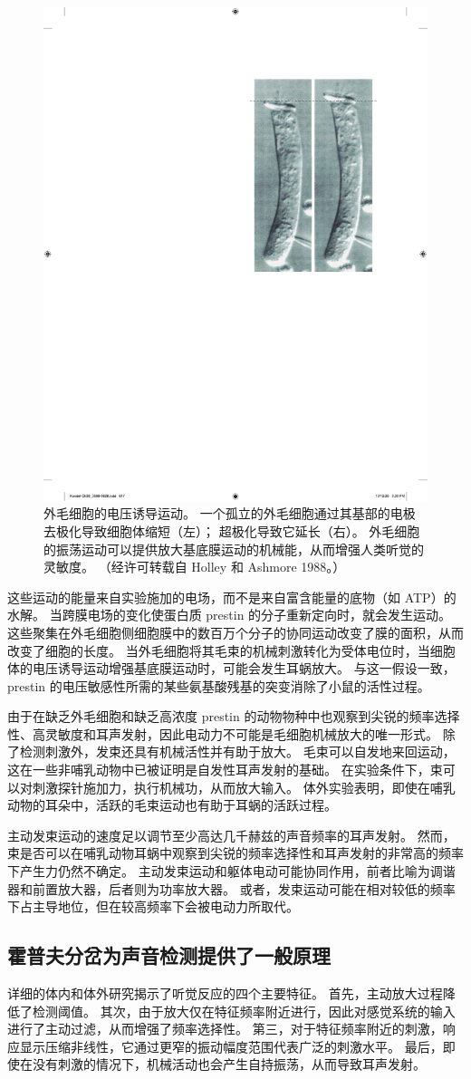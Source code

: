 \begin{figure}[htbp]
	\centering
	\includegraphics[width=0.5\linewidth]{chap26/fig_26_14}
	\caption{外毛细胞的电压诱导运动。 一个孤立的外毛细胞通过其基部的电极去极化导致细胞体缩短（左）； 超极化导致它延长（右）。 外毛细胞的振荡运动可以提供放大基底膜运动的机械能，从而增强人类听觉的灵敏度。 （经许可转载自 Holley 和 Ashmore 1988。）}
	\label{fig:26_14}
\end{figure}


这些运动的能量来自实验施加的电场，而不是来自富含能量的底物（如 ATP）的水解。 当跨膜电场的变化使蛋白质 prestin 的分子重新定向时，就会发生运动。 这些聚集在外毛细胞侧细胞膜中的数百万个分子的协同运动改变了膜的面积，从而改变了细胞的长度。 当外毛细胞将其毛束的机械刺激转化为受体电位时，当细胞体的电压诱导运动增强基底膜运动时，可能会发生耳蜗放大。 与这一假设一致，prestin 的电压敏感性所需的某些氨基酸残基的突变消除了小鼠的活性过程。

由于在缺乏外毛细胞和缺乏高浓度 prestin 的动物物种中也观察到尖锐的频率选择性、高灵敏度和耳声发射，因此电动力不可能是毛细胞机械放大的唯一形式。 除了检测刺激外，发束还具有机械活性并有助于放大。 毛束可以自发地来回运动，这在一些非哺乳动物中已被证明是自发性耳声发射的基础。 在实验条件下，束可以对刺激探针施加力，执行机械功，从而放大输入。 体外实验表明，即使在哺乳动物的耳朵中，活跃的毛束运动也有助于耳蜗的活跃过程。

主动发束运动的速度足以调节至少高达几千赫兹的声音频率的耳声发射。 然而，束是否可以在哺乳动物耳蜗中观察到尖锐的频率选择性和耳声发射的非常高的频率下产生力仍然不确定。 主动发束运动和躯体电动可能协同作用，前者比喻为调谐器和前置放大器，后者则为功率放大器。 或者，发束运动可能在相对较低的频率下占主导地位，但在较高频率下会被电动力所取代。


\subsection{霍普夫分岔为声音检测提供了一般原理}
详细的体内和体外研究揭示了听觉反应的四个主要特征。 首先，主动放大过程降低了检测阈值。 其次，由于放大仅在特征频率附近进行，因此对感觉系统的输入进行了主动过滤，从而增强了频率选择性。 第三，对于特征频率附近的刺激，响应显示压缩非线性，它通过更窄的振动幅度范围代表广泛的刺激水平。 最后，即使在没有刺激的情况下，机械活动也会产生自持振荡，从而导致耳声发射。

